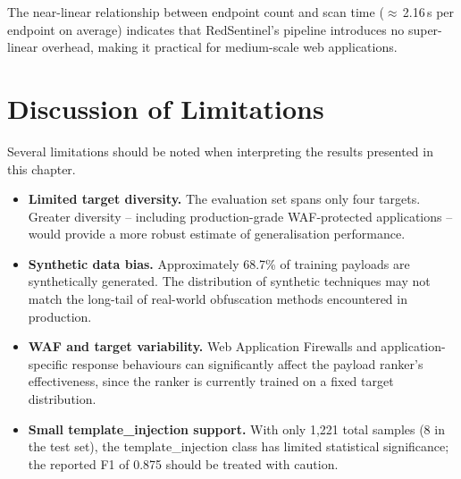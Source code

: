 The near-linear relationship between endpoint count and scan time ($\approx$\,2.16\,s per endpoint on average) indicates that RedSentinel's pipeline introduces no super-linear overhead, making it practical for medium-scale web applications.
 
\section{Discussion of Limitations}
\label{sec:limitations}
 
Several limitations should be noted when interpreting the results presented in this chapter.
 
\begin{itemize}[itemsep=2pt, topsep=-15pt]
  \item \textbf{Limited target diversity.} The evaluation set spans only four targets. Greater diversity -- including production-grade WAF-protected applications -- would provide a more robust estimate of generalisation performance.
  \item \textbf{Synthetic data bias.} Approximately 68.7\% of training payloads are synthetically generated. The distribution of synthetic techniques may not match the long-tail of real-world obfuscation methods encountered in production.
  \item \textbf{WAF and target variability.} Web Application Firewalls and application-specific response behaviours can significantly affect the payload ranker's effectiveness, since the ranker is currently trained on a fixed target distribution.
  \item \textbf{Small template\_injection support.} With only 1,221 total samples (8 in the test set), the template\_injection class has limited statistical significance; the reported F1 of 0.875 should be treated with caution.
\end{itemize}